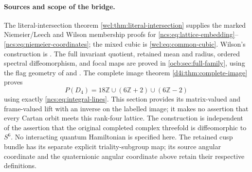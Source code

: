 \documentclass[11pt]{article}
\theoremstyle{definition}
\begin{document}
\paragraph{Sources and scope of the bridge.}
The literal-intersection theorem \cref{wcl:thm:literal-intersection}
supplies the marked Niemeier/Leech and Wilson membership proofs for
\eqref{ncs:eq:lattice-embedding}--\eqref{ncs:eq:niemeier-coordinates};
the mixed cubic is \eqref{wcl:eq:common-cubic}. Wilson's construction
is \cite{esn:Wilson2009}. The full invariant quotient, retained
mean and radius, ordered spectral diffeomorphism, and focal maps are
proved in \cref{ocb:sec:full-family}, using the flag geometry of
\cite[Sections~2.3--2.6]{MareWillems2013} and
\cite[Proposition~2.8.2 and Theorems~2.7.4, 2.8.3]{Yokota2009}.
The complete image theorem \cref{d4i:thm:complete-image} proves
\[
 P(D_4)=18\mathbb Z\cup(6\mathbb Z+2)\cup(6\mathbb Z-2)
\]
using exactly \eqref{ncs:eq:integral-lines}. This section provides
its matrix-valued and frame-valued lift with an inverse on the
labelled image; it makes no assertion that every Cartan orbit meets
this rank-four lattice. The construction is independent of the
assertion that the original completed complex threefold is
diffeomorphic to $S^6$. No interacting quantum Hamiltonian is
specified here. The retained cusp bundle has its separate explicit
triality-subgroup map; its source angular coordinate and the
quaternionic angular coordinate above retain their respective
definitions.



\end{document}
